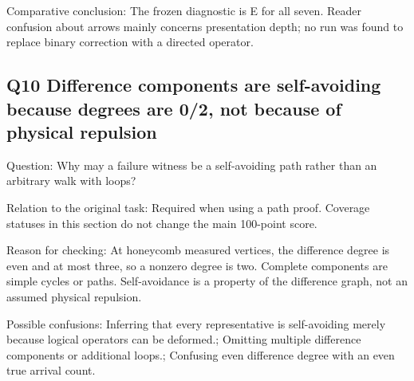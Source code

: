\documentclass[11pt,a4paper]{article}
\begin{document}
Comparative conclusion: The frozen diagnostic is E for all seven. Reader confusion about arrows mainly concerns presentation depth; no run was found to replace binary correction with a directed operator.

\clearpage
\subsection{Q10 Difference components are self-avoiding because degrees are 0/\allowbreak{}2,\allowbreak{} not because of physical repulsion}
\label{aspect:Q10}
Question: Why may a failure witness be a self-avoiding path rather than an arbitrary walk with loops?

Relation to the original task: Required when using a path proof. Coverage statuses in this section do not change the main 100-point score.

Reason for checking: At honeycomb measured vertices,\allowbreak{} the difference degree is even and at most three,\allowbreak{} so a nonzero degree is two. Complete components are simple cycles or paths. Self-avoidance is a property of the difference graph,\allowbreak{} not an assumed physical repulsion.

Possible confusions: Inferring that every representative is self-avoiding merely because logical operators can be deformed.; Omitting multiple difference components or additional loops.; Confusing even difference degree with an even true arrival count.
\end{document}
